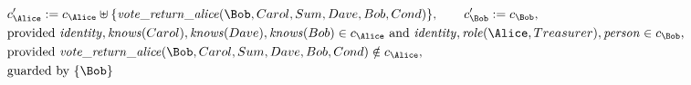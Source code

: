 \begin{align*}
&
c'_
{
\Alice
}
 := 
c_
{
\Alice
}
 \uplus 
\{
\mathit{\detokenize{
vote_return_alice
}}
(
\Bob
,
Carol
,
Sum
,
Dave
,
Bob
,
Cond
)
\}
, \qquad 
c'_
{
\Bob
}
 := 
c_
{
\Bob
}
,\\
&
\text{provided } 
\mathit{\detokenize{
identity
}}
,
\mathit{\detokenize{
knows
}}
(
Carol
)
,
\mathit{\detokenize{
knows
}}
(
Dave
)
,
\mathit{\detokenize{
knows
}}
(
Bob
)
 \in c_
{
\Alice
}
 \text{ and } 
\mathit{\detokenize{
identity
}}
,
\mathit{\detokenize{
role
}}
(
\Alice
,
Treasurer
)
,
\mathit{\detokenize{
person
}}
 \in c_
{
\Bob
}
,\\
&
\text{provided } 
\mathit{\detokenize{
vote_return_alice
}}
(
\Bob
,
Carol
,
Sum
,
Dave
,
Bob
,
Cond
)
 \notin c_
{
\Alice
}
,\\
&
\text{guarded by } \{
\Bob
\}
\end{align*}

